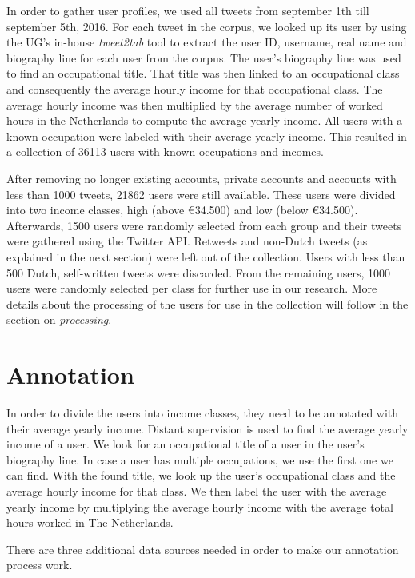 \documentclass[
10pt, %
a4paper, %
oneside, %
headinclude,footinclude, %
] {book}%
\begin{document}
In order to gather user profiles, we used all tweets from september 1th till september 5th, 2016. For each tweet in the corpus, we looked up its user by using the UG's in-house \textit{tweet2tab} tool to extract the user ID, username, real name and biography line for each user from the corpus. The user's biography line was used to find an occupational title. That title was then linked to an occupational class and consequently the average hourly income for that occupational class. The average hourly income was then multiplied by the average number of worked hours in the Netherlands to compute the average yearly income. All users with a known occupation were labeled with their average yearly income. This resulted in a collection of 36113 users with known occupations and incomes.

After removing no longer existing accounts, private accounts and accounts with less than 1000 tweets, 21862 users were still available. These users were divided into two income classes, high (above \euro 34.500) and low (below \euro 34.500). Afterwards, 1500 users were randomly selected from each group and their tweets were gathered using the Twitter API. Retweets and non-Dutch tweets (as explained in the next section) were left out of the collection. Users with less than 500 Dutch, self-written tweets were discarded. From the remaining users, 1000 users were randomly selected per class for further use in our research. More details about the processing of the users for use in the collection will follow in the section on \textit{processing}.

\section{Annotation}
In order to divide the users into income classes, they need to be annotated with their average yearly income. Distant supervision is used to find the average yearly income of a user. We look for an occupational title of a user in the user's biography line. In case a user has multiple occupations, we use the first one we can find. With the found title, we look up the user's occupational class and the average hourly income for that class. We then label the user with the average yearly income by multiplying the average hourly income with the average total hours worked in The Netherlands. 

There are three additional data sources needed in order to make our annotation process work. 
\end{document}

